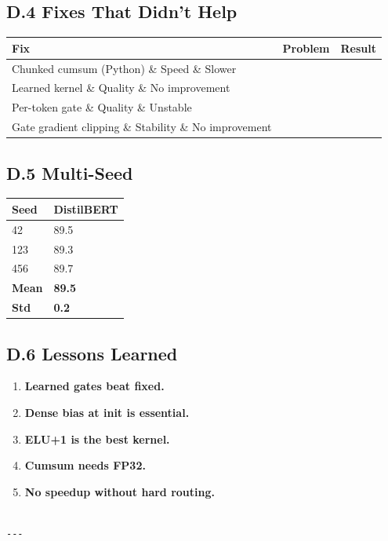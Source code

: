 \subsection{D.4 Fixes That Didn't Help}

\begin{table}[H]
\centering
\small
\begin{tabular}{lll}
\toprule
\textbf{Fix} & \textbf{Problem} & \textbf{Result} \\
\midrule
Chunked cumsum (Python) \& Speed \& Slower \\
Learned kernel \& Quality \& No improvement \\
Per-token gate \& Quality \& Unstable \\
Gate gradient clipping \& Stability \& No improvement \\
\bottomrule
\end{tabular}
\end{table}

\subsection{D.5 Multi-Seed}

\begin{table}[H]
\centering
\small
\begin{tabular}{ll}
\toprule
\textbf{Seed} & \textbf{DistilBERT} \\
\midrule
42 & 89.5 \\
123 & 89.3 \\
456 & 89.7 \\
\textbf{Mean} & \textbf{89.5} \\
\textbf{Std} & \textbf{0.2} \\
\bottomrule
\end{tabular}
\end{table}

\subsection{D.6 Lessons Learned}

\begin{enumerate}
\item \textbf{Learned gates beat fixed.}
\item \textbf{Dense bias at init is essential.}
\item \textbf{ELU+1 is the best kernel.}
\item \textbf{Cumsum needs FP32.}
\item \textbf{No speedup without hard routing.}
\end{enumerate}
\begin{lstlisting}

---
\end{lstlisting}


